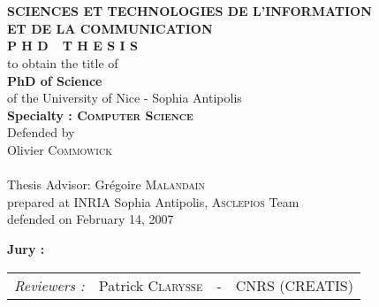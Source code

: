 

\begin{titlepage}
\begin{center}
 \\
\vspace*{0.3cm}
 \\
\noindent \textbf{SCIENCES ET TECHNOLOGIES DE L'INFORMATION \\ ET DE LA COMMUNICATION} \\
\vspace*{0.5cm}
\noindent \Huge \textbf{P H D\ \ T H E S I S} \\
\vspace*{0.3cm}
\noindent \large {to obtain the title of} \\
\vspace*{0.3cm}
\noindent \LARGE \textbf{PhD of Science} \\
\vspace*{0.3cm}
\noindent \Large of the University of Nice - Sophia Antipolis \\
\noindent \Large \textbf{Specialty : \textsc{Computer Science}}\\
\vspace*{0.4cm}
\noindent \large {Defended by\\}
\noindent \LARGE Olivier \textsc{Commowick} \\
\vspace*{0.8cm}
 \\
\vspace*{0.8cm}
\noindent \Large Thesis Advisor: Grégoire \textsc{Malandain} \\
\vspace*{0.2cm}
\noindent \Large prepared at INRIA Sophia Antipolis, \textsc{Asclepios} Team\\
\vspace*{0.2cm}
\noindent \large defended on February 14, 2007 \\
\vspace*{0.5cm}
\end{center}
\noindent \large \textbf{Jury :} \\
\begin{center}
\noindent \large 
\begin{tabular}{llcl}
      \textit{Reviewers :}	& Patrick \textsc{Clarysse}		& - & CNRS (CREATIS)\\

\end{tabular}
\end{center}
\end{titlepage}
